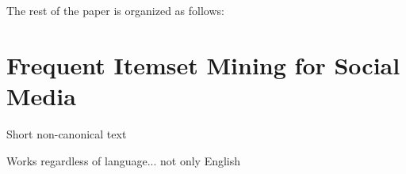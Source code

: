 \documentclass{sig-alternate}
\begin{document}
The rest of the paper is organized as follows:


\section{Frequent Itemset Mining for Social Media}
\label{sec:socmed}
Short non-canonical text

Works regardless of language... not only English
\end{document}
